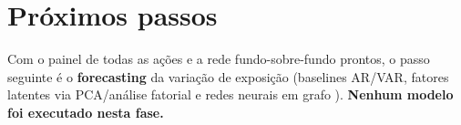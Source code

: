 \documentclass[12pt,a4paper]{article}
\begin{document}
\section{Próximos passos}\label{sec:next}
Com o painel de todas as ações e a rede fundo-sobre-fundo prontos, o passo seguinte é o \textbf{forecasting}
da variação de exposição (baselines AR/VAR, fatores latentes via PCA/análise fatorial \citep{artesbarroso2023}
e redes neurais em grafo \citep{sanchezlengeling2021}). \textbf{Nenhum modelo foi executado nesta fase.}



\end{document}
